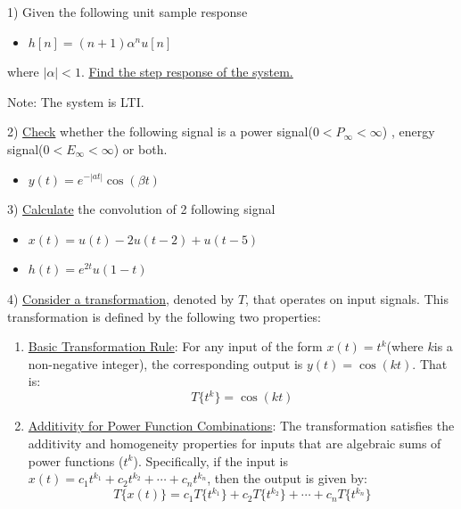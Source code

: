 \LTR

1) Given the following unit sample response
\begin{itemize}
    \item $h[n] = (n + 1)\alpha^n u[n]$
\end{itemize}
where $|\alpha| < 1$. \underline{Find the step response of the system.}

Note: The system is LTI.

\vspace{1.5em}

2) \underline{Check} whether the following signal is a power signal($0 < P_\infty < \infty$) , energy signal($0 < E_\infty < \infty$) or both.
\begin{itemize}
    \item $y(t) = e^{-|at|}\cos (\beta t)$
\end{itemize}

\vspace{1.5em}

3) \underline{Calculate} the convolution of 2 following signal
\begin{itemize}
    \item $x(t) = u(t) - 2u(t - 2) + u(t - 5)$
    \item $h(t) = e^{2t}u(1 - t)$
\end{itemize}

\vspace{1.5em}

4) \underline{Consider a transformation}, denoted by $T$, that operates on input signals. This transformation is defined by the following two properties:

\begin{enumerate}
    \item \underline{Basic Transformation Rule}: For any input of the form $x(t) = t^k$(where $k$is a non-negative integer), the corresponding output is $y(t) = \cos (kt)$. That is:
    \[
        T\{t^k\} = \cos (kt)
    \]
    
    \item \underline{Additivity for Power Function Combinations}: The transformation satisfies the additivity and homogeneity properties for inputs that are algebraic sums of power functions ($t^k$). Specifically, if the input is $x(t) = c_1t^{k_1} + c_2t^{k_2} + \cdots + c_nt^{k_n}$, then the output is given by:
    \[
        T\{x(t)\} = c_1T\{t^{k_1}\} + c_2T\{t^{k_2}\} + \cdots + c_nT\{t^{k_n}\}
    \]
\end{enumerate}


